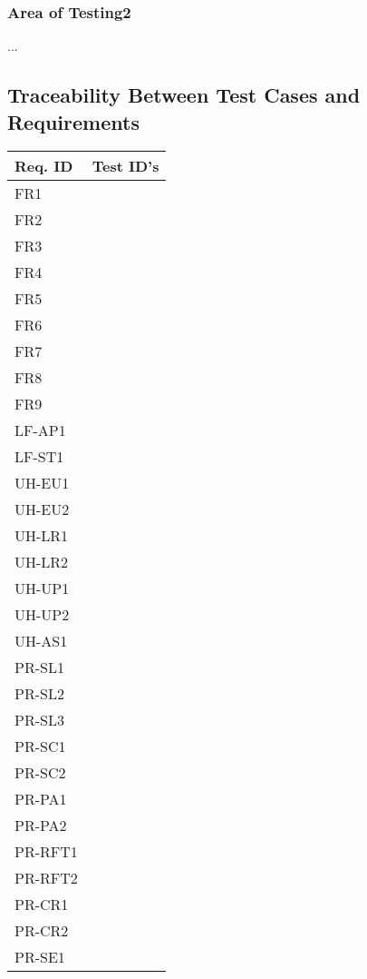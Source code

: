 \documentclass[12pt, titlepage]{article}
\begin{document}
\subsubsection{Area of Testing2}

...

\subsection{Traceability Between Test Cases and Requirements}


\begin{longtable}{|l|l|}
  \hline
  \textbf{Req. ID} & \textbf{Test ID's} \\
  \hline
  FR1 & \\ \hline
  FR2 & \\ \hline
  FR3 & \\ \hline
  FR4 & \\ \hline
  FR5 & \\ \hline
  FR6 & \\ \hline
  FR7 & \\ \hline
  FR8 & \\ \hline
  FR9 & \\ \hline
  LF-AP1 & \\ \hline
  LF-ST1 & \\ \hline
  UH-EU1 & \\ \hline
  UH-EU2 & \\ \hline
  UH-LR1 & \\ \hline
  UH-LR2 & \\ \hline
  UH-UP1 & \\ \hline
  UH-UP2 & \\ \hline
  UH-AS1 & \\ \hline
  PR-SL1 & \\ \hline
  PR-SL2 & \\ \hline
  PR-SL3 & \\ \hline
  PR-SC1 & \\ \hline
  PR-SC2 & \\ \hline
  PR-PA1 & \\ \hline
  PR-PA2 & \\ \hline
  PR-RFT1 & \\ \hline
  PR-RFT2 & \\ \hline
  PR-CR1 & \\ \hline
  PR-CR2 & \\ \hline
  PR-SE1 & \\ \hline

\end{longtable}
\end{document}
